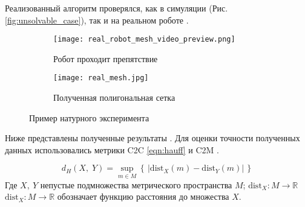 Реализованный алгоритм проверялся, как в симуляции (Рис. \ref{fig:unsolvable_case}), так и на реальном роботе .

\begin{figure}[H]
    \begin{subfigure}[t]{0.49\textwidth}
            \centering\texttt{[image: real\_robot\_mesh\_video\_preview.png]}
        \caption{Робот проходит препятствие}
        \label{fig:real_robot_mesh_video_preview.png}
    \end{subfigure}
    \begin{subfigure}[t]{0.49\textwidth}
        \centering\texttt{[image: real\_mesh.jpg]}
        \caption{Полученная полигональная сетка}
        \label{fig:real_mesh.jpg}
    \end{subfigure}
    \caption{Пример натурного эксперимента}
    \label{fig:real_exp_map_creation}
\end{figure}

Ниже представлены полученные результаты . Для оценки точности полученных данных использовались метрики C2C \eqref{eqn:hauff} и C2M .

\begin{equation}
    \label{eqn:hauff}
    d_{H}(X,\;Y)=\sup _{m\in M}\left\{\,|\mathrm {dist} _{X}(m)-\mathrm {dist} _{Y}(m)|\,\right\}    
\end{equation}
Где $X,\ Y$ непустые подмножества метрического пространства $M$; $\mathrm {dist} _{X}\colon M\to \mathbb {R}$ $\mathrm {dist} _{X}\colon M\to \mathbb {R}$ обозначает функцию расстояния до множества $X$.



